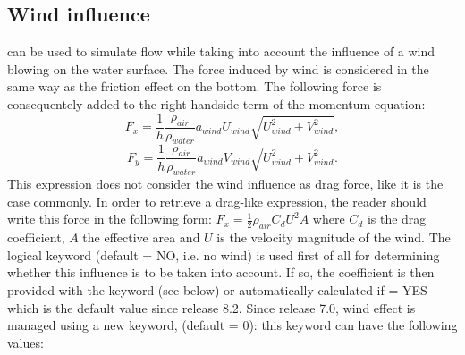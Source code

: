 \subsection{Wind influence}

 can be used to simulate flow while taking into account the
influence of a wind blowing on the water surface.
The force induced by wind is considered in the same way as the friction effect
on the bottom.
The following force is consequentely added to the right handside term of the
momentum equation:
\begin{equation}
F_x = \frac{1}{h} \frac{\rho_{air}}{\rho_{water}}a_{wind}U_{wind}\sqrt{U^2_{wind}+V^2_{wind}},
\end{equation}
\begin{equation}
F_y = \frac{1}{h} \frac{\rho_{air}}{\rho_{water}}a_{wind}V_{wind}\sqrt{U^2_{wind}+V^2_{wind}}.
\end{equation}
This expression does not consider the wind influence as drag force,
like it is the case commonly.
In order to retrieve a drag-like expression, the reader should write this force
in the following form:
$F_x = \frac{1}{2}\rho_{air}C_d U^2 A$ where $C_d$ is the drag coefficient,
$A$ the effective area and $U$ is the velocity magnitude of the wind.
The logical keyword  (default = NO, i.e. no wind) is used first of
all for determining whether this influence is to be taken into account.
If so, the coefficient is then provided with the keyword
 (see below) or automatically calculated
if  = YES
which is the default value since release 8.2.
Since release 7.0, wind effect is managed using a new keyword,
 (default = 0): this keyword can have the following
values:

